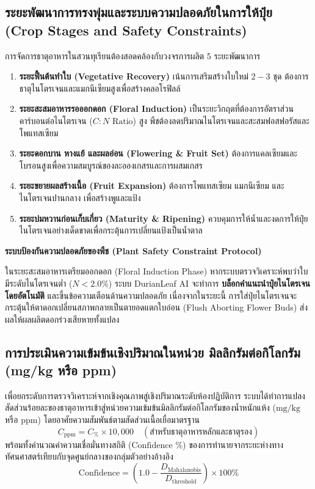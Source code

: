 \subsection{ระยะพัฒนาการทรงพุ่มและระบบความปลอดภัยในการให้ปุ๋ย (Crop Stages and Safety Constraints)}
การจัดการธาตุอาหารในสวนทุเรียนต้องสอดคล้องกับวงจรการผลิต 5 ระยะพัฒนาการ
\begin{enumerate}
  \item \textbf{ระยะฟื้นต้นทำใบ (Vegetative Recovery)} เน้นการเสริมสร้างใบใหม่ $2 - 3$ ชุด ต้องการธาตุไนโตรเจนและแมกนีเซียมสูงเพื่อสร้างคลอโรฟิลล์
  \item \textbf{ระยะสะสมอาหารรอออกดอก (Floral Induction)} เป็นระยะวิกฤตที่ต้องการอัตราส่วนคาร์บอนต่อไนโตรเจน ($C:N\text{ Ratio}$) สูง พืชต้องลดปริมาณไนโตรเจนและสะสมฟอสฟอรัสและโพแทสเซียม
  \item \textbf{ระยะดอกบาน หางแย้ และผลอ่อน (Flowering \& Fruit Set)} ต้องการแคลเซียมและโบรอนสูงเพื่อความสมบูรณ์ของละอองเกสรและการผสมเกสร
  \item \textbf{ระยะขยายผลสร้างเนื้อ (Fruit Expansion)} ต้องการโพแทสเซียม แมกนีเซียม และไนโตรเจนปานกลาง เพื่อสร้างพูและแป้ง
  \item \textbf{ระยะบ่มหวานก่อนเก็บเกี่ยว (Maturity \& Ripening)} ควบคุมการให้น้ำและงดการให้ปุ๋ยไนโตรเจนอย่างเด็ดขาดเพื่อกระตุ้นการเปลี่ยนแป้งเป็นน้ำตาล
\end{enumerate}

\begin{theorybox}
\textbf{ระบบป้องกันความปลอดภัยของพืช (Plant Safety Constraint Protocol)}\par
ในระยะสะสมอาหารเตรียมออกดอก (Floral Induction Phase) หากระบบตรวจวิเคราะห์พบว่าใบมีระดับไนโตรเจนต่ำ ($N < 2.0\%$) ระบบ DurianLeaf AI จะทำการ \textbf{บล็อกคำแนะนำปุ๋ยไนโตรเจนโดยอัตโนมัติ} และขึ้นข้อความเตือนด้านความปลอดภัย เนื่องจากในระยะนี้ การใส่ปุ๋ยไนโตรเจนจะกระตุ้นให้ตาดอกเปลี่ยนสภาพกลายเป็นตายอดแตกใบอ่อน (Flush Aborting Flower Buds) ส่งผลให้ผลผลิตดอกร่วงเสียหายทั้งแปลง
\end{theorybox}

\subsection{การประเมินความเข้มข้นเชิงปริมาณในหน่วย มิลลิกรัมต่อกิโลกรัม (mg/kg หรือ ppm)}
เพื่อยกระดับการตรวจวิเคราะห์จากเชิงคุณภาพสู่เชิงปริมาณระดับห้องปฏิบัติการ ระบบได้ทำการแปลงสัดส่วนร้อยละของธาตุอาหารเข้าสู่หน่วยความเข้มข้นมิลลิกรัมต่อกิโลกรัมของน้ำหนักแห้ง ($\text{mg/kg}$ หรือ $\text{ppm}$) โดยอาศัยความสัมพันธ์ตามสัดส่วนเนื้อเยื่อมาตรฐาน
\begin{equation}
  C_{\text{ppm}} = C_{\%} \times 10,000 \quad (\text{สำหรับธาตุอาหารหลักและธาตุรอง})
\end{equation}
พร้อมทั้งคำนวณค่าความเชื่อมั่นทางสถิติ ($\text{Confidence } \%$) ของการทำนายจากระยะห่างทางทัศนศาสตร์เทียบกับจุดศูนย์กลางของกลุ่มตัวอย่างอ้างอิง
\begin{equation}
  \text{Confidence} = \left( 1.0 - \frac{D_{\text{Mahalanobis}}}{D_{\text{threshold}}} \right) \times 100\%
\end{equation}

